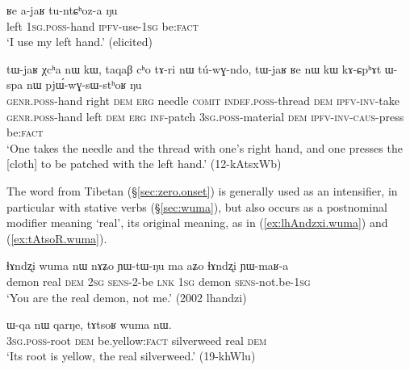 \begin{exe}
\ex \label{ex:Re.ajaR}
\gll ʁe a-jaʁ tu-ntɕʰoz-a ŋu \\
left \textsc{1sg}.\textsc{poss}-hand \textsc{ipfv}-use-\textsc{1sg} be:\textsc{fact} \\
\glt `I use my left hand.' (elicited)
\end{exe}


\begin{exe}
\ex \label{ex:tWjaR.Xcha}
\gll tɯ-jaʁ χcʰa nɯ kɯ, taqaβ cʰo tɤ-ri nɯ tú-wɣ-ndo, tɯ-jaʁ ʁe nɯ kɯ kɤ-ɕpʰɤt ɯ-spa nɯ pjɯ́-wɣ-sɯ-stʰoʁ ŋu \\
\textsc{genr}.\textsc{poss}-hand right \textsc{dem} \textsc{erg} needle \textsc{comit}  \textsc{indef}.\textsc{poss}-thread \textsc{dem} \textsc{ipfv}-\textsc{inv}-take \textsc{genr}.\textsc{poss}-hand left \textsc{dem} \textsc{erg} \textsc{inf}-patch \textsc{3sg}.\textsc{poss}-material \textsc{dem} \textsc{ipfv}-\textsc{inv}-\textsc{caus}-press be:\textsc{fact} \\
\glt `One takes the needle and the thread with one's right hand, and one presses the [cloth] to be patched with the left hand.' (12-kAtsxWb)
\end{exe}


The word  from Tibetan  (§\ref{sec:zero.onset}) is generally used as an intensifier, in particular with stative verbs (§\ref{sec:wuma}), but also occurs as a postnominal modifier meaning `real', its original meaning, as in (\ref{ex:lhAndzxi.wuma}) and (\ref{ex:tAtsoR.wuma}).

\begin{exe}
\ex \label{ex:lhAndzxi.wuma}
\gll ɬɤndʐi wuma nɯ nɤʑo ɲɯ-tɯ-ŋu ma aʑo ɬɤndʐi ɲɯ-maʁ-a \\
demon real \textsc{dem} \textsc{2sg} \textsc{sens}-2-be \textsc{lnk} \textsc{1sg} demon \textsc{sens}-not.be-\textsc{1sg} \\
\glt `You are the real demon, not me.' (2002 lhandzi)
\end{exe}

\begin{exe}
\ex \label{ex:tAtsoR.wuma}
\gll ɯ-qa nɯ qarŋe, tɤtsoʁ wuma nɯ. \\
\textsc{3sg}.\textsc{poss}-root \textsc{dem} be.yellow:\textsc{fact} silverweed real \textsc{dem} \\
\glt `Its root is yellow, the real silverweed.' (19-khWlu)
\end{exe}

